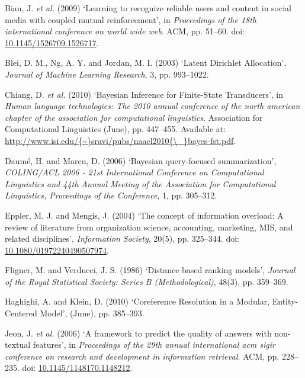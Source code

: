 \documentclass[11pt,preprint, authoryear]{article}
\numberwithin{equation}{section}
\begin{document}
\hypertarget{ref-Bian2009}{}
Bian, J. \emph{et al.} (2009) `Learning to recognize reliable users and
content in social media with coupled mutual reinforcement', in
\emph{Proceedings of the 18th international conference on world wide
web}. ACM, pp. 51--60. doi:
\href{https://doi.org/10.1145/1526709.1526717}{10.1145/1526709.1526717}.

\hypertarget{ref-Blei2003}{}
Blei, D. M., Ng, A. Y. and Jordan, M. I. (2003) `Latent Dirichlet
Allocation', \emph{Journal of Machine Learning Research}, 3, pp.
993--1022.

\hypertarget{ref-Chiang2010}{}
Chiang, D. \emph{et al.} (2010) `Bayesian Inference for Finite-State
Transducers', in \emph{Human language technologies: The 2010 annual
conference of the north american chapter of the association for
computational linguistics}. Association for Computational Linguistics
(June), pp. 447--455. Available at:
\href{http://www.isi.edu/\%7B~\%7Dsravi/pubs/naacl2010\%7B/_\%7Dbayes-fst.pdf}{http://www.isi.edu/\{\textasciitilde{}\}sravi/pubs/naacl2010\{\textbackslash{}\_\}bayes-fst.pdf}.

\hypertarget{ref-Daume2006}{}
Daumé, H. and Marcu, D. (2006) `Bayesian query-focused summarization',
\emph{COLING/ACL 2006 - 21st International Conference on Computational
Linguistics and 44th Annual Meeting of the Association for Computational
Linguistics, Proceedings of the Conference}, 1, pp. 305--312.

\hypertarget{ref-Eppler2004}{}
Eppler, M. J. and Mengis, J. (2004) `The concept of information
overload: A review of literature from organization science, accounting,
marketing, MIS, and related disciplines', \emph{Information Society},
20(5), pp. 325--344. doi:
\href{https://doi.org/10.1080/01972240490507974}{10.1080/01972240490507974}.

\hypertarget{ref-Fligner1986}{}
Fligner, M. and Verducci, J. S. (1986) `Distance based ranking models',
\emph{Journal of the Royal Statistical Society: Series B
(Methodological)}, 48(3), pp. 359--369.

\hypertarget{ref-Haghighi2010}{}
Haghighi, A. and Klein, D. (2010) `Coreference Resolution in a Modular,
Entity-Centered Model', (June), pp. 385--393.

\hypertarget{ref-Jeon2006}{}
Jeon, J. \emph{et al.} (2006) `A framework to predict the quality of
answers with non-textual features', in \emph{Proceedings of the 29th
annual international acm sigir conference on research and development in
information retrieval}. ACM, pp. 228--235. doi:
\href{https://doi.org/10.1145/1148170.1148212}{10.1145/1148170.1148212}.
\end{document}

